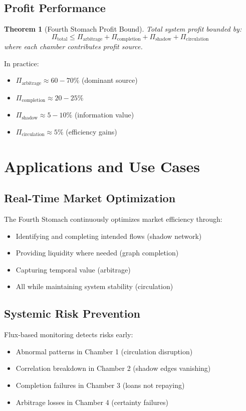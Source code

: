 \documentclass[12pt]{article}
\newtheorem{theorem}{Theorem}
\begin{document}
\subsection{Profit Performance}

\begin{theorem}[Fourth Stomach Profit Bound]
Total system profit bounded by:
$$
\Pi_{\text{total}} \leq \Pi_{\text{arbitrage}} + \Pi_{\text{completion}} + \Pi_{\text{shadow}} + \Pi_{\text{circulation}}
$$
where each chamber contributes profit source.
\end{theorem}

In practice:
\begin{itemize}
    \item $\Pi_{\text{arbitrage}} \approx 60-70\%$ (dominant source)
    \item $\Pi_{\text{completion}} \approx 20-25\%$
    \item $\Pi_{\text{shadow}} \approx 5-10\%$ (information value)
    \item $\Pi_{\text{circulation}} \approx 5\%$ (efficiency gains)
\end{itemize}

\section{Applications and Use Cases}

\subsection{Real-Time Market Optimization}

The Fourth Stomach continuously optimizes market efficiency through:
\begin{itemize}
    \item Identifying and completing intended flows (shadow network)
    \item Providing liquidity where needed (graph completion)
    \item Capturing temporal value (arbitrage)
    \item All while maintaining system stability (circulation)
\end{itemize}

\subsection{Systemic Risk Prevention}

Flux-based monitoring detects risks early:
\begin{itemize}
    \item Abnormal patterns in Chamber 1 (circulation disruption)
    \item Correlation breakdown in Chamber 2 (shadow edges vanishing)
    \item Completion failures in Chamber 3 (loans not repaying)
    \item Arbitrage losses in Chamber 4 (certainty failures)
\end{itemize}
\end{document}
